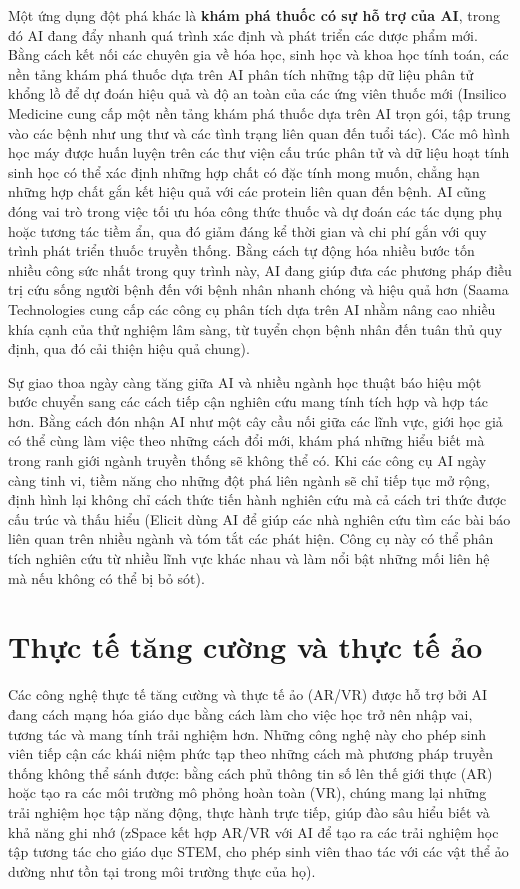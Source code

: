 Một ứng dụng đột phá khác là \textbf{khám phá thuốc có sự hỗ trợ của AI}, trong đó AI đang đẩy nhanh quá trình xác định và phát triển các dược phẩm mới. Bằng cách kết nối các chuyên gia về hóa học, sinh học và khoa học tính toán, các nền tảng khám phá thuốc dựa trên AI phân tích những tập dữ liệu phân tử khổng lồ để dự đoán hiệu quả và độ an toàn của các ứng viên thuốc mới (Insilico Medicine cung cấp một nền tảng khám phá thuốc dựa trên AI trọn gói, tập trung vào các bệnh như ung thư và các tình trạng liên quan đến tuổi tác). Các mô hình học máy được huấn luyện trên các thư viện cấu trúc phân tử và dữ liệu hoạt tính sinh học có thể xác định những hợp chất có đặc tính mong muốn, chẳng hạn những hợp chất gắn kết hiệu quả với các protein liên quan đến bệnh. AI cũng đóng vai trò trong việc tối ưu hóa công thức thuốc và dự đoán các tác dụng phụ hoặc tương tác tiềm ẩn, qua đó giảm đáng kể thời gian và chi phí gắn với quy trình phát triển thuốc truyền thống. Bằng cách tự động hóa nhiều bước tốn nhiều công sức nhất trong quy trình này, AI đang giúp đưa các phương pháp điều trị cứu sống người bệnh đến với bệnh nhân nhanh chóng và hiệu quả hơn (Saama Technologies cung cấp các công cụ phân tích dựa trên AI nhằm nâng cao nhiều khía cạnh của thử nghiệm lâm sàng, từ tuyển chọn bệnh nhân đến tuân thủ quy định, qua đó cải thiện hiệu quả chung).

Sự giao thoa ngày càng tăng giữa AI và nhiều ngành học thuật báo hiệu một bước chuyển sang các cách tiếp cận nghiên cứu mang tính tích hợp và hợp tác hơn. Bằng cách đón nhận AI như một cây cầu nối giữa các lĩnh vực, giới học giả có thể cùng làm việc theo những cách đổi mới, khám phá những hiểu biết mà trong ranh giới ngành truyền thống sẽ không thể có. Khi các công cụ AI ngày càng tinh vi, tiềm năng cho những đột phá liên ngành sẽ chỉ tiếp tục mở rộng, định hình lại không chỉ cách thức tiến hành nghiên cứu mà cả cách tri thức được cấu trúc và thấu hiểu (Elicit dùng AI để giúp các nhà nghiên cứu tìm các bài báo liên quan trên nhiều ngành và tóm tắt các phát hiện. Công cụ này có thể phân tích nghiên cứu từ nhiều lĩnh vực khác nhau và làm nổi bật những mối liên hệ mà nếu không có thể bị bỏ sót).

\section{Thực tế tăng cường và thực tế ảo}

Các công nghệ thực tế tăng cường và thực tế ảo (AR/VR) được hỗ trợ bởi AI đang cách mạng hóa giáo dục bằng cách làm cho việc học trở nên nhập vai, tương tác và mang tính trải nghiệm hơn. Những công nghệ này cho phép sinh viên tiếp cận các khái niệm phức tạp theo những cách mà phương pháp truyền thống không thể sánh được: bằng cách phủ thông tin số lên thế giới thực (AR) hoặc tạo ra các môi trường mô phỏng hoàn toàn (VR), chúng mang lại những trải nghiệm học tập năng động, thực hành trực tiếp, giúp đào sâu hiểu biết và khả năng ghi nhớ (zSpace kết hợp AR/VR với AI để tạo ra các trải nghiệm học tập tương tác cho giáo dục STEM, cho phép sinh viên thao tác với các vật thể ảo dường như tồn tại trong môi trường thực của họ).

